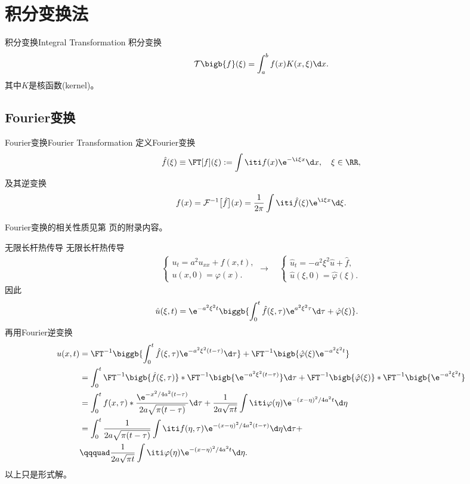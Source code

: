 \chapter{积分变换法}
\begin{definition}{积分变换}{Integral Transformation}
	积分变换
	\[
		\mathcal T\bigb{f}(\xi)=\int_a^bf(x)K(x,\xi)\d x.
	\]
	其中$K$是核函数(kernel)。
\end{definition}
\section{Fourier变换}
\setcounter{subsubsection}{1}
\begin{definition}{Fourier变换}{Fourier Transformation}
	定义Fourier变换
	\[
		\hat f(\xi)\equiv\FT[f](\xi):=\int\iti f(x)\e^{-\i\xi x}\d x,\quad \xi\in\RR,
	\]
	及其逆变换
	\[
		f(x)=\mathcal F^{-1}\big[\hat f\big](x)=\frac1{2\pi}\int\iti\hat f(\xi)\e^{\i\xi x}\d\xi.
	\]
\end{definition}
Fourier变换的相关性质见第 \pageref{The Property of Fourier Transformation} 页的附录内容。
\begin{example}{无限长杆热传导}{}
	无限长杆热传导
	\begin{align*}
		\begin{cases}
			u_t=a^2u_{xx}+f(x,t),\\
			u(x,0)=\varphi(x).
		\end{cases}\longrightarrow\quad\begin{cases}
			\hat u_t=-a^2\xi^2\hat u+\hat f,\\
			\hat u(\xi,0)=\hat\varphi(\xi).
		\end{cases}
	\end{align*}
	因此
	\begin{align*}
		\hat u(\xi,t)&=\e^{-a^2\xi^2t}\biggb{\int_0^t\hat f(\xi,\tau)\e^{a^2\xi^2\tau}\d\tau+\hat\varphi(\xi)}.
	\end{align*}
	再用Fourier逆变换
	\begin{align*}
		u(x,t)&=\FT^{-1}\biggb{\int_0^t\hat f(\xi,\tau)\e^{-a^2\xi^2(t-\tau)}\d\tau}+\FT^{-1}\bigb{\hat\varphi(\xi)\e^{-a^2\xi^2t}}\\
		&=\int_0^t\FT^{-1}\bigb{\hat f(\xi,\tau)}\ast\FT^{-1}\bigb{\e^{-a^2\xi^2(t-\tau)}}\d\tau+\FT^{-1}\bigb{\hat\varphi(\xi)}\ast\FT^{-1}\bigb{\e^{-a^2\xi^2t}}\\
		&=\int_0^tf(x,\tau)\ast\frac{\e^{-x^2/4a^2(t-\tau)}}{2a\sqrt{\pi(t-\tau)}}\d\tau+\frac1{2a\sqrt{\pi t}}\int\iti\varphi(\eta)\e^{-(x-\eta)^2/4a^2t}\d\eta\\
		&=\int_0^t\frac1{2a\sqrt{\pi(t-\tau)}}\int\iti f(\eta,\tau)\e^{-(x-\eta)^2/4a^2(t-\tau)}\d\eta\d\tau+\\
		&\qqquad\frac1{2a\sqrt{\pi t}}\int\iti\varphi(\eta)\e^{-(x-\eta)^2/4a^2t}\d\eta.
	\end{align*}
	以上只是形式解。
\end{example}
